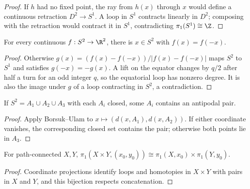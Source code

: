 \begin{proof}
\leanok
\sketch If $h$ had no fixed point, the ray from $h(x)$ through $x$ would
define a continuous retraction $D^2\to S^1$. A loop in $S^1$ contracts
linearly in $D^2$; composing with the retraction would contract it in $S^1$,
contradicting $\pi_1(S^1)\cong\Z$.
\end{proof}

\begin{theorem}
\label{thm:borsuk-ulam-dim2}
\leanok
{}
For every continuous $f:S^2\to\R^2$, there is $x\in S^2$ with $f(x)=f(-x)$.
\end{theorem}

\begin{proof}
\leanok
\sketch Otherwise $g(x)=(f(x)-f(-x))/|f(x)-f(-x)|$ maps $S^2$ to $S^1$
and satisfies $g(-x)=-g(x)$. A lift on the equator changes by $q/2$ after
half a turn for an odd integer $q$, so the equatorial loop has nonzero degree.
It is also the image under $g$ of a loop contracting in $S^2$, a contradiction.
\end{proof}

\begin{corollary}
\label{cor:sphere-three-closed-sets-antipodal}
\leanok
{}
If $S^2=A_1\cup A_2\cup A_3$ with each $A_i$ closed, some $A_i$ contains
an antipodal pair.
\end{corollary}

\begin{proof}
\leanok
\sketch Apply Borsuk--Ulam to
$x\mapsto(d(x,A_1),d(x,A_2))$. If either coordinate vanishes, the corresponding
closed set contains the pair; otherwise both points lie in $A_3$.
\end{proof}

\begin{proposition}[$\pi_1$ of a product]
\label{prop:pi1-of-product-space}
\leanok
{}
For path-connected $X,Y$,
$\pi_1(X\times Y,(x_0,y_0))\cong\pi_1(X,x_0)\times\pi_1(Y,y_0)$.
\end{proposition}

\begin{proof}
\leanok
\sketch Coordinate projections identify loops and homotopies in $X\times Y$
with pairs in $X$ and $Y$, and this bijection respects concatenation.
\end{proof}

